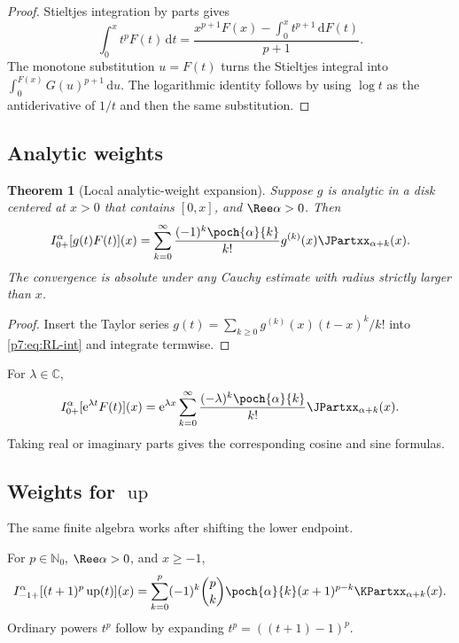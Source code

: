 \documentclass[11pt,oneside]{article}
\newtheorem{theorem}{Theorem}[section]
\theoremstyle{definition}
\theoremstyle{remark}
\newcommand{\Up}{\operatorname{up}}
\newcommand{\C}{\mathbb C}
\newcommand{\N}{\mathbb N}
\newcommand{\dd}{\,\mathrm d}
\newcommand{\e}{\mathrm e}
\newcommand{\1}{\mathbf 1}
\begin{document}
\begin{proof}
Stieltjes integration by parts gives
\[
 \int_0^xt^pF(t)\dd t
 =\frac{x^{p+1}F(x)-\int_0^xt^{p+1}\dd F(t)}{p+1}.
\]
The monotone substitution $u=F(t)$ turns the Stieltjes integral into
$\int_0^{F(x)}G(u)^{p+1}\dd u$.  The logarithmic identity follows by using
$\log t$ as the antiderivative of $1/t$ and then the same substitution.
\end{proof}

\subsection{Analytic weights}

\begin{theorem}[Local analytic-weight expansion]
\label{p7:thm:analytic-weight}
Suppose $g$ is analytic in a disk centered at $x>0$ that contains $[0,x]$, and
$\Ree\alpha>0$.  Then
\begin{equation}
 I_{0+}^{\alpha}[g(t)F(t)](x)
 =\sum_{k=0}^{\infty}\frac{(-1)^k\poch{\alpha}{k}}{k!}
 g^{(k)}(x)\JPartxx_{\alpha+k}(x).
 \label{p7:eq:analytic-weight}
\end{equation}
The convergence is absolute under any Cauchy estimate with radius strictly larger than $x$.
\end{theorem}

\begin{proof}
Insert the Taylor series
$g(t)=\sum_{k\ge0}g^{(k)}(x)(t-x)^k/k!$ into \cref{p7:eq:RL-int} and integrate termwise.
\end{proof}

\begin{corollary}
For $\lambda\in\C$,
\begin{equation}
 I_{0+}^{\alpha}[\e^{\lambda t}F(t)](x)
 =\e^{\lambda x}\sum_{k=0}^{\infty}
 \frac{(-\lambda)^k\poch{\alpha}{k}}{k!}\JPartxx_{\alpha+k}(x).
 \label{p7:eq:exponential-weight}
\end{equation}
Taking real or imaginary parts gives the corresponding cosine and sine formulas.
\end{corollary}

\subsection{Weights for $\Up$}

The same finite algebra works after shifting the lower endpoint.

\begin{proposition}
\label{p7:prop:up-weighted}
For $p\in\N_0$, $\Ree\alpha>0$, and $x\ge-1$,
\begin{equation}
 I_{-1+}^{\alpha}[(t+1)^p\Up(t)](x)
 =\sum_{k=0}^{p}(-1)^k\binom pk\poch{\alpha}{k}
 (x+1)^{p-k}\KPartxx_{\alpha+k}(x).
 \label{p7:eq:up-weighted}
\end{equation}
Ordinary powers $t^p$ follow by expanding $t^p=((t+1)-1)^p$.
\end{proposition}
\end{document}
